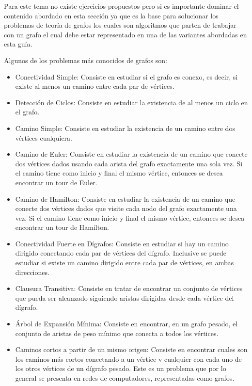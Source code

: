 Para este tema no existe ejercicios propuestos pero si es importante dominar el contenido abordado en esta sección ya que es la base para solucionar los problemas de teoría de grafos los cuales son algoritmos que parten de trabajar con un grafo el cual debe estar representado en una de las variantes abordadas en esta guía.

Algunos de los problemas más conocidos de grafos son:

\begin{itemize}
	\item Conectividad Simple: Consiste en estudiar si el grafo es conexo, es decir, si existe al menos un camino entre cada par de vértices.
	
	\item Detección de Ciclos: Consiste en estudiar la existencia de al menos un ciclo en el grafo.
	
	\item Camino Simple: Consiste en estudiar la existencia de un camino entre dos vértices cualquiera.
	
	\item Camino de Euler: Consiste en estudiar la existencia de un camino que conecte dos vértices dados usando cada arista del grafo exactamente una sola vez. Si el camino tiene como inicio y final el mismo vértice, entonces se desea encontrar un tour de Euler.
	
	\item Camino de Hamilton: Consiste en estudiar la existencia de un camino que conecte dos vértices dados que visite cada nodo del grafo exactamente una vez. Si el camino tiene como inicio y final el mismo vértice, entonces se desea encontrar un tour de Hamilton.
	
	\item Conectividad Fuerte en Dígrafos: Consiste en estudiar si hay un camino dirigido conectando cada par de vértices del dígrafo. Inclusive se puede estudiar si existe un camino dirigido entre cada par de vértices, en ambas direcciones.
	
	\item Clausura Transitiva: Consiste en tratar de encontrar un conjunto de vértices que pueda ser alcanzado siguiendo aristas dirigidas desde cada vértice del dígrafo.
	
	\item Árbol de Expansión Mínima: Consiste en encontrar, en un grafo pesado, el conjunto de aristas de peso mínimo que conecta a todos los vértices.
	
	\item Caminos cortos a partir de un mismo origen: Consiste en encontrar cuales son los caminos más cortos conectando a un vértice v cualquier con cada uno de los otros vértices de un dígrafo pesado. Este es un problema que por lo general se presenta en redes de computadores, representadas como grafos.
	

\end{itemize}

